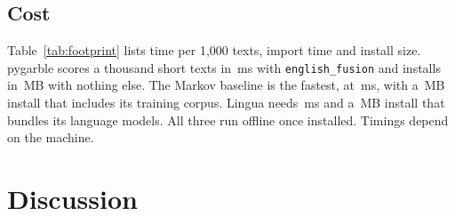 \documentclass[10pt,twocolumn]{article}
\newcommand{\code}[1]{\texttt{#1}}
\newcommand{\TRS}{Tweets vs.\ Random Strings}
\begin{document}
\subsection{Cost}
\label{sec:cost}

\begin{table}[t]
\centering
\footnotesize
\caption{Footprint. Time is the default decision over all \nB{} texts of
\TRS{} on one thread of an \cpuname{}, median of five runs after a
warm-up. Install size counts the installed files of the distribution and
its runtime dependencies, plus the training corpus gibberish-detector's
model is built from. Import time covers the import statement only.
Building each detector and the warm-up run, in which lingua loads its
language models, are not timed.}
\label{tab:footprint}

\end{table}

Table~\ref{tab:footprint} lists time per 1,000 texts, import time and
install size. pygarble scores a thousand short texts in
\,ms with \code{english\_fusion} and installs in
\,MB with nothing else. The Markov baseline is the
fastest, at \,ms, with a \,MB
install that includes its training corpus.
Lingua needs \,ms and a \,MB install that bundles
its language models. All
three run offline once installed. Timings depend on the machine.

\section{Discussion}
\label{sec:discussion}
\end{document}
